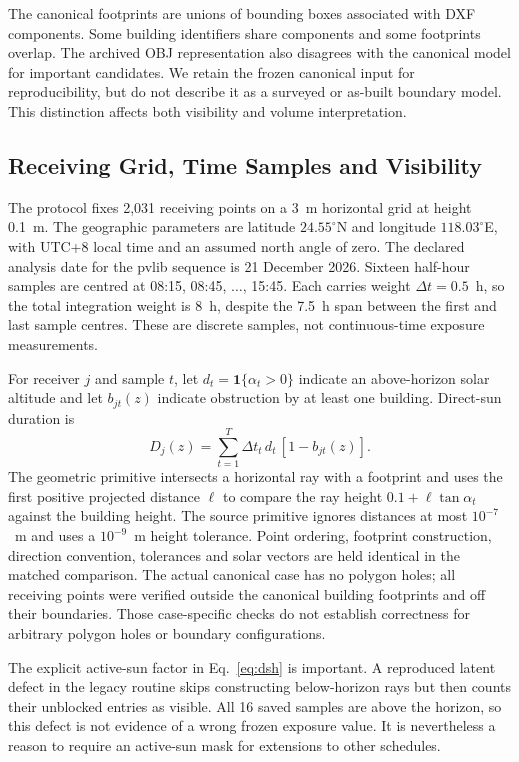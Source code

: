 \documentclass{llncs}
\newcommand{\ind}{\mathbf{1}}
\begin{document}
The canonical footprints are unions of bounding boxes associated with DXF components. Some building identifiers share components and some footprints overlap. The archived OBJ representation also disagrees with the canonical model for important candidates. We retain the frozen canonical input for reproducibility, but do not describe it as a surveyed or as-built boundary model. This distinction affects both visibility and volume interpretation.

\subsection{Receiving Grid, Time Samples and Visibility}
The protocol fixes 2,031 receiving points on a 3~m horizontal grid at height 0.1~m. The geographic parameters are latitude $24.55^\circ$N and longitude $118.03^\circ$E, with UTC+8 local time and an assumed north angle of zero. The declared analysis date for the pvlib sequence is 21 December 2026. Sixteen half-hour samples are centred at 08:15, 08:45, $\ldots$, 15:45. Each carries weight $\Delta t=0.5$~h, so the total integration weight is 8~h, despite the 7.5~h span between the first and last sample centres. These are discrete samples, not continuous-time exposure measurements.

For receiver $j$ and sample $t$, let $d_t=\ind\{\alpha_t>0\}$ indicate an above-horizon solar altitude and let $b_{jt}(z)$ indicate obstruction by at least one building. Direct-sun duration is
\begin{equation}
 D_j(z)=\sum_{t=1}^{T}\Delta t_t\,d_t\,[1-b_{jt}(z)].
 \label{eq:dsh}
\end{equation}
The geometric primitive intersects a horizontal ray with a footprint and uses the first positive projected distance $\ell$ to compare the ray height $0.1+\ell\tan\alpha_t$ against the building height. The source primitive ignores distances at most $10^{-7}$~m and uses a $10^{-9}$~m height tolerance. Point ordering, footprint construction, direction convention, tolerances and solar vectors are held identical in the matched comparison. The actual canonical case has no polygon holes; all receiving points were verified outside the canonical building footprints and off their boundaries. Those case-specific checks do not establish correctness for arbitrary polygon holes or boundary configurations.

The explicit active-sun factor in Eq.~\ref{eq:dsh} is important. A reproduced latent defect in the legacy routine skips constructing below-horizon rays but then counts their unblocked entries as visible. All 16 saved samples are above the horizon, so this defect is not evidence of a wrong frozen exposure value. It is nevertheless a reason to require an active-sun mask for extensions to other schedules.
\end{document}
